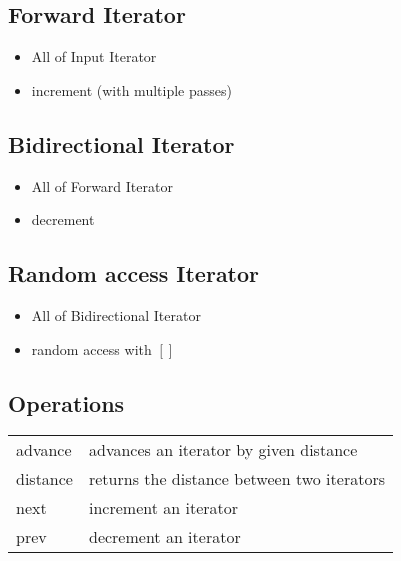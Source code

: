 \subsection{Forward Iterator}
\begin{itemize}
	\item All of Input Iterator
	\item increment (with multiple passes)
\end{itemize}

\subsection{Bidirectional Iterator}
\begin{itemize}
	\item All of Forward Iterator
	\item decrement
\end{itemize}

\subsection{Random access Iterator}
\begin{itemize}
	\item All of Bidirectional Iterator
	\item random access with $[]$
\end{itemize}

\subsection{Operations}
\begin{tabularx}{\columnwidth}{lX}
	advance  & advances an iterator by given distance \\
	distance & returns the distance between two iterators \\
	next     & increment an iterator \\
	prev     & decrement an iterator \\
\end{tabularx}

